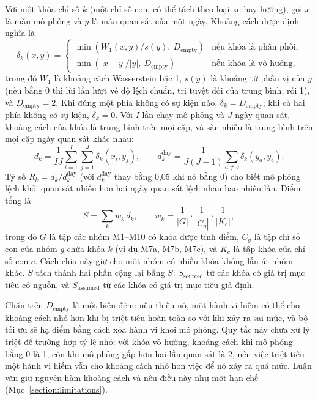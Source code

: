 \documentclass[../main.tex]{subfiles}
\begin{document}
Với một khóa chỉ số $k$ (một chỉ số con, có thể tách theo loại xe hay hướng), gọi $x$ là mẫu mô phỏng và $y$ là mẫu quan sát của một ngày. Khoảng cách được định nghĩa là
\begin{equation}
\delta_k(x, y) =
\begin{cases}
\min\left( W_1(x, y) / s(y),\ D_{\text{empty}} \right) & \text{nếu khóa là phân phối,}\\
\min\left( |x - y| / |y|,\ D_{\text{empty}} \right) & \text{nếu khóa là vô hướng,}
\end{cases}
\label{eq:distance}
\end{equation}
trong đó $W_1$ là khoảng cách Wasserstein bậc 1, $s(y)$ là khoảng tứ phân vị của $y$ (nếu bằng 0 thì lùi lần lượt về độ lệch chuẩn, trị tuyệt đối của trung bình, rồi 1), và $D_{\text{empty}} = 2$. Khi đúng một phía không có sự kiện nào, $\delta_k = D_{\text{empty}}$; khi cả hai phía không có sự kiện, $\delta_k = 0$. Với $I$ lần chạy mô phỏng và $J$ ngày quan sát, khoảng cách của khóa là trung bình trên mọi cặp, và sàn nhiễu là trung bình trên mọi cặp ngày quan sát khác nhau:
\begin{equation}
d_k = \frac{1}{IJ} \sum_{i=1}^{I} \sum_{j=1}^{J} \delta_k(x_i, y_j), \qquad
d_k^{\text{day}} = \frac{1}{J(J-1)} \sum_{a \ne b} \delta_k(y_a, y_b).
\label{eq:dk}
\end{equation}
Tỷ số $R_k = d_k / d_k^{\text{day}}$ (với $d_k^{\text{day}}$ thay bằng 0,05 khi nó bằng 0) cho biết mô phỏng lệch khỏi quan sát nhiều hơn hai ngày quan sát lệch nhau bao nhiêu lần. Điểm tổng là
\begin{equation}
S = \sum_{k} w_k\, d_k, \qquad
w_k = \frac{1}{|G|} \cdot \frac{1}{|C_g|} \cdot \frac{1}{|K_c|},
\label{eq:score}
\end{equation}
trong đó $G$ là tập các nhóm M1--M10 có khóa được tính điểm, $C_g$ là tập chỉ số con của nhóm $g$ chứa khóa $k$ (ví dụ M7a, M7b, M7c), và $K_c$ là tập khóa của chỉ số con $c$. Cách chia này giữ cho một nhóm có nhiều khóa không lấn át nhóm khác. $S$ tách thành hai phần cộng lại bằng $S$: $S_{\text{sourced}}$ từ các khóa có giá trị mục tiêu có nguồn, và $S_{\text{assumed}}$ từ các khóa có giá trị mục tiêu giả định.

Chặn trên $D_{\text{empty}}$ là một biến đệm: nếu thiếu nó, một hành vi hiếm có thể cho khoảng cách nhỏ hơn khi bị triệt tiêu hoàn toàn so với khi xảy ra sai mức, và bộ tối ưu sẽ hạ điểm bằng cách xóa hành vi khỏi mô phỏng. Quy tắc này chưa xử lý triệt để trường hợp tỷ lệ nhỏ: với khóa vô hướng, khoảng cách khi mô phỏng bằng 0 là 1, còn khi mô phỏng gấp hơn hai lần quan sát là 2, nên việc triệt tiêu một hành vi hiếm vẫn cho khoảng cách nhỏ hơn việc để nó xảy ra quá mức. Luận văn giữ nguyên hàm khoảng cách và nêu điều này như một hạn chế (Mục~\ref{section:limitations}).
\end{document}
